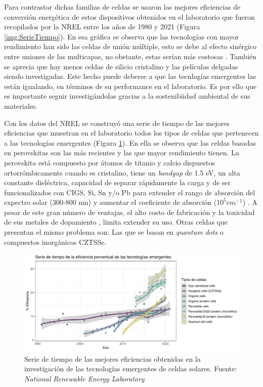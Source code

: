 Para contrastar dichas familias de celdas se usaron las mejores eficiencias de conversión energética de estos dispositivos obtenidos en el laboratorio que fueron recopilados por la NREL entre los años de 1980 y 2021 (Figura \ref{img:SerieTiempo}). En esa gráfica se observa que las tecnologías con mayor rendimiento han sido las celdas de unión múltiple, esto se debe al efecto sinérgico entre uniones de las multicapas, no obstante, estas serían más costosas \cite{chowdhury2020overview}. También se aprecia que hay menos celdas de silicio cristalino y las películas delgadas siendo investigadas. Este hecho puede deberse a que las tecnlogías emergentes las están igualando, en términos de su performance en el laboratorio. Es por ello que es importante seguir investigándolas gracias a la sostenibiidad ambiental de sus materiales. 

Con los datos del NREL se construyó una serie de tiempo de las mejores eficiencias que muestran en el laboratorio todos los tipos de celdas que pertenecen a las tecnologías emergentes  (Figura \ref{img:SerieEmergente}). En ella se observa que las celdas basadas en perovskitas son las más recientes y las que mayor rendimiento tienen. La perovskita está compuesto por átomos de titanio y calcio dispuestos ortorrómbicamente cuando es cristalino, tiene un \textit{bandgap} de 1.5 eV, un alta constante dieléctrica, capacidad de separar rápidamente la carga y de ser funcionalizados con CIGS, Si, Sn y/o Pb para extender el rango de absorción del expectro solar (300-800 nm) y aumentar el coeficiente de absorción ($10^5cm^{-1}$) \cite{velilla2019outdoor}. A pesar de este gran número de ventajas, el alto costo de fabricación y la toxicidad de sus metales de dopamiento \cite{wang2022sustainable}, limita extender su uso. Otras celdas que presentan el mismo problema son: Las que se basan en \textit{quantum dots}\cite{pan2014high} o compuestos inorgánicos CZTSSe\cite{suryawanshi2013czts}. 

\begin{figure}[h!]
    \begin{center}
        \includegraphics[scale=0.6]{img/emergentes.pdf}
    \end{center}
    \caption{Serie de tiempo de las mejores eficiencias obtenidas en la investigación de las tecnologías emergentes de celdas solares.
    Fuente: \textit{National Renewable Energy Laboratory} \cite{nrel}}
    \label{img:SerieEmergente}
\end{figure}

